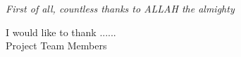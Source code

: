 
\begin{acknowledgment}      

\begin{center}
\textit{First of all, countless thanks to ALLAH the almighty} 
\end{center}
\vspace{5mm}

I would like to thank ......\\

\hfill Project Team Members

\end{acknowledgment}



